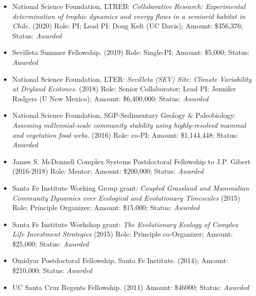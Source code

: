 \documentclass[margin,line,12pt]{res}
\begin{document}
\begin{resume}
\begin{itemize}
\item National Science Foundation, LTREB: \emph{Collaborative Research: Experimental determination of trophic dynamics and energy flows in a semiarid habitat in Chile.} (2020) Role: PI; Lead PI: Doug Kelt (UC Davis); Amount: \$356,376; Status: \emph{Awarded}

\item Sevilleta Summer Fellowship. (2019) Role: Single-PI; Amount: \$5,000; Status: \emph{Awarded}

\item National Science Foundation, LTER: \emph{Sevilleta (SEV) Site: Climate Variability at Dryland Ecotones.} (2018) Role: Senior Collaborator; Lead PI: Jennifer Rudgers (U New Mexico); Amount: \$6,400,000; Status: \emph{Awarded}

\item National Science Foundation, SGP-Sedimentary Geology \& Paleobiology: \emph{Assessing millennial-scale community stability using highly-resolved mammal and vegetation food webs.} (2016) Role: co-PI; Amount: \$1,144,448; Status: \emph{Awarded}

\item James S. McDonnell Complex Systems Postdoctoral Fellowship to J.P. Gibert (2016-2018) Role: Mentor; Amount: \$200,000; Status: \emph{Awarded}

\item Santa Fe Institute Working Group grant: \emph{Coupled Grassland and Mammalian Community Dynamics over Ecological and Evolutionary Timescales} (2015) Role: Principle Organizer; Amount: \$15,000; Status: \emph{Awarded}

\item Santa Fe Institute Workshop grant: \emph{The Evolutionary Ecology of Complex Life Investment Strategies} (2015) Role: Principle co-Organizer; Amount: \$25,000; Status: \emph{Awarded}

\item Omidyar Postdoctoral Fellowship, Santa Fe Institute. (2014); Amount: \$210,000; Status: \emph{Awarded}

\item UC Santa Cruz Regents Fellowship. (2011) Amount: \$46000; Status: \emph{Awarded}


\end{itemize}
\end{resume}
\end{document}

